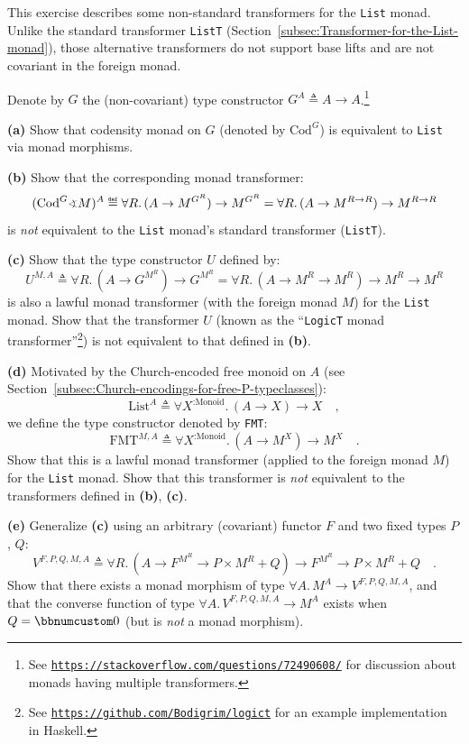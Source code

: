 This exercise describes some non-standard transformers for the \lstinline!List!
monad. Unlike
the standard transformer \lstinline!ListT! (Section~\ref{subsec:Transformer-for-the-List-monad}),
those alternative transformers do not support base lifts and are not
covariant in the foreign monad.

Denote by $G$ the (non-covariant) type constructor $G^{A}\triangleq A\rightarrow A$.\footnote{See \texttt{\href{https://stackoverflow.com/questions/72490608/}{https://stackoverflow.com/questions/72490608/}}
for discussion about monads having multiple transformers.}

\textbf{(a)} Show that codensity monad on $G$ (denoted by $\text{Cod}^{G}$)
is equivalent to \lstinline!List! via monad morphisms.

\textbf{(b)} Show that the corresponding monad transformer: 
\[
(\text{Cod}^{G}\varangle M)^{A}\triangleq\forall R.\,(A\rightarrow M^{G^{R}})\rightarrow M^{G^{R}}=\forall R.\,(A\rightarrow M^{R\rightarrow R})\rightarrow M^{R\rightarrow R}
\]
is \emph{not} equivalent to the \lstinline!List! monad\textsf{'}s standard
transformer (\lstinline!ListT!).

\textbf{(c)} Show that the type constructor $U$ defined by:
\[
U^{M,A}\triangleq\forall R.\,(A\rightarrow G^{M^{R}})\rightarrow G^{M^{R}}=\forall R.\,(A\rightarrow M^{R}\rightarrow M^{R})\rightarrow M^{R}\rightarrow M^{R}
\]
is also a lawful monad transformer (with the foreign monad $M$) for
the \lstinline!List! monad. Show that the transformer $U$ (known
as the \textsf{``}\lstinline!LogicT! monad transformer\textsf{''}\footnote{See \texttt{\href{https://github.com/Bodigrim/logict}{https://github.com/Bodigrim/logict}}
for an example implementation in Haskell.}) is not equivalent to that defined in \textbf{(b)}. 

\textbf{(d)} Motivated by the Church-encoded free monoid on $A$ (see
Section~\ref{subsec:Church-encodings-for-free-P-typeclasses}):
\[
\text{List}^{A}\triangleq\forall X^{:\text{Monoid}}.\,(A\rightarrow X)\rightarrow X\quad,
\]
we define the type constructor denoted by \lstinline!FMT!:
\[
\text{FMT}^{M,A}\triangleq\forall X^{:\text{Monoid}}.\,(A\rightarrow M^{X})\rightarrow M^{X}\quad.
\]
Show that this is a lawful monad transformer (applied to the foreign
monad $M$) for the \lstinline!List! monad. Show that this transformer
is \emph{not} equivalent to the transformers defined in \textbf{(b)},
\textbf{(c)}.

\textbf{(e)} Generalize \textbf{(c)} using an arbitrary (covariant)
functor $F$ and two fixed types $P$, $Q$:
\[
V^{F,P,Q,M,A}\triangleq\forall R.\,(A\rightarrow F^{M^{R}}\rightarrow P\times M^{R}+Q)\rightarrow F^{M^{R}}\rightarrow P\times M^{R}+Q\quad.
\]
Show that there exists a monad morphism of type $\forall A.\,M^{A}\rightarrow V^{F,P,Q,M,A}$,
and that the converse function of type $\forall A.\,V^{F,P,Q,M,A}\rightarrow M^{A}$
exists when $Q=\bbnum 0$ (but is \emph{not} a monad morphism).

